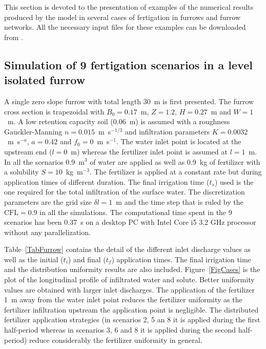\documentclass[review,authoryear]{elsarticle}
\begin{document}
This section is devoted to the presentation of examples of the numerical results
produced by the model in several cases of fertigation in furrows and furrow
networks. All the necessary input files for these examples can be downloaded
from \cite{Surcos}.

\subsection{Simulation of 9 fertigation scenarios in a level isolated furrow}

A single zero slope furrow with total length 30~m is first presented. The
furrow cross section is trapezoidal with $B_0=0.17$~m, $Z=1.2$, $H=0.27$~m and
$W=1$~m. A low retention capacity soil (0.06~m) is assumed with a roughness 
Gauckler-Manning $n=0.015$~m~s$^{-1/3}$ and infiltration parameters
$K=0.0032$~m~s$^{-a}$, $a=0.42$ and $f_0=0$~m~s$^{-1}$.
The water inlet point is located at the upstream end ($l=0$~m) whereas the
fertilizer inlet point is assumed at $l=1$~m. In all the scenarios 0.9~m$^3$ of
water are applied as well as 0.9~kg of fertilizer with a solubility
$S=10$~kg~m$^{-3}$. The fertilizer is applied at a constant rate but during
application times of different duration. The final irrigation time ($t_s$) used
is the one required for the total infiltration of the surface water. The
discretization parameters are the grid size $\delta l=1$~m and the time step
that is ruled by the $\mathrm{CFL}=0.9$ in all the simulations. The
computational time spent in the 9 scenarios has been 0.37~s on a desktop PC with
Intel Core i5 3.2 GHz processor without any parallelization.

Table~\ref{TabFurrow} contains the detail of the different inlet discharge
values as well as the initial ($t_i$) and final ($t_f$) application times. The
final irrigation time and the distribution uniformity results are also included.
Figure~\ref{FigCases} is the plot of the longitudinal profile of infiltrated
water and solute. Better uniformity values are obtained with larger inlet
discharges. The application of the fertilizer 1~m away from the water inlet
point reduces the fertilizer uniformity as the fertilizer infiltration upstream
the application point is negligible. The distributed fertilizer application
strategies (in scenarios 2, 5 an 8 it is applied during the first half-period
whereas in scenarios 3, 6 and 8 it is applied during the second half-period) reduce
considerably the fertilizer uniformity in general.
\end{document}
